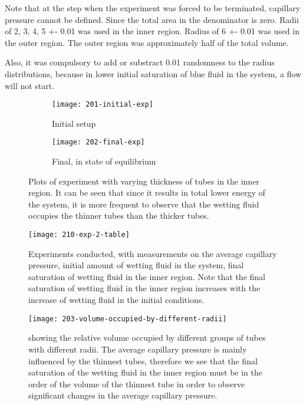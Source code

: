 	Note that at the step when the experiment was forced to be terminated, capillary pressure cannot be defined. Since the total area in the denominator is zero. Radii of {2, 3, 4, 5} +- 0.01 was used in the inner region. Radius of 6 +- 0.01 was used in the outer region. The outer region was approximately half of the total volume.
	
	Also, it was compulsory to add or substract 0.01 randomness to the radius distributions, because in lower initial saturation of blue fluid in the system, a flow will not start.
	
	\begin{figure}[H]
		\centering
		\begin{subfigure}{0.46\textwidth}
			\centering
			\texttt{[image: 201-initial-exp]}
			\caption{Initial setup}
		\end{subfigure}
		\begin{subfigure}{0.46\textwidth}
			\centering
			\texttt{[image: 202-final-exp]}
			\caption{Final, in state of equilibrium}
		\end{subfigure}
		\caption{Plots of experiment with varying thickness of tubes in the inner region. It can be seen that since it results in total lower energy of the system, it is more frequent to observe that the wetting fluid occupies the thinner tubes than the thicker tubes.}
	\end{figure}
	
	\begin{figure}[H]
		\centering
		\texttt{[image: 210-exp-2-table]}
		\caption{Experiments conducted, with measurements on the average capillary pressure, initial amount of wetting fluid in the system, final saturation of wetting fluid in the inner region. Note that the final saturation of wetting fluid in the inner region increases with the increase of wetting fluid in the initial conditions.}
		\label{fig:210-exp-2-table}
	\end{figure}
	
	\begin{figure}[H]
		\centering
		\texttt{[image: 203-volume-occupied-by-different-radii]}
		\caption{showing the relative volume occupied by different groups of tubes with different radii. The average capillary pressure is mainly influenced by the thinnest tubes, therefore we see that the final saturation of the wetting fluid in the inner region must be in the order of the volume of the thinnest tube in order to observe significant changes in the average capillary pressure. }
		\label{fig:203-volume-occupied-by-different-radii}
	\end{figure}
	
